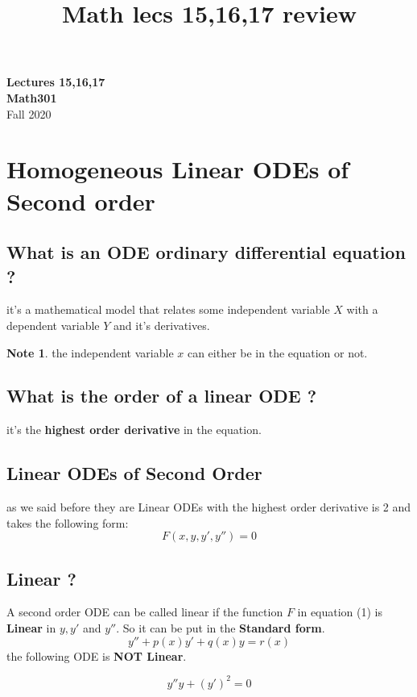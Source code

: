 \documentclass[11pt]{article}
\theoremstyle{definition}
\newtheorem{note}{Note}
\begin{document}
\setcounter{section}{0}
\title{Math lecs 15,16,17 review}

\thispagestyle{empty}
\tableofcontents
\begin{center}
{\LARGE \bf Lectures 15,16,17}\\
{\large \bf Math301}\\
Fall 2020
\end{center}

\section{Homogeneous Linear ODEs of Second order} 
\subsection{What is an ODE ordinary differential equation ?}
it's a mathematical model that relates some independent variable $X$ with a dependent variable $Y$ and it's derivatives.  
\begin{note}
the independent variable $x$ can either be in the equation or not. 
\end{note}
\subsection{What is the order of a linear ODE ?}
it's the \textbf{highest order derivative} in the equation. 
\subsection{Linear ODEs of Second Order}
as we said before they are Linear ODEs with the highest order derivative is 2 and takes the following form: 
\begin{equation}
    F(x,y,y',y'')=0
\end{equation}
\subsection{Linear ?}
A second order ODE can be called linear if the function $F$ in equation (1) is \textbf{Linear} in $y,y'$ and $y''$. So it can be put in the \textbf{Standard form}.
\begin{equation}
    y''+p(x)y'+q(x)y=r(x)
\end{equation}
the following ODE is \textbf{ NOT Linear}.

\begin{equation}
    y''y+(y')^2=0
\end{equation}
\end{document}
